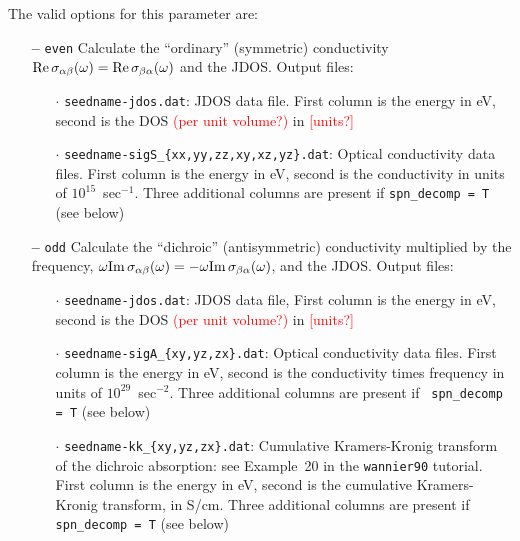 The valid options for this parameter are:
\begin{itemize}

\item[{\bf --}] \verb#even# Calculate the ``ordinary'' (symmetric)
  conductivity ${\rm Re}\,\sigma_{\alpha\beta}(\omega)={\rm
    Re}\,\sigma_{\beta\alpha}(\omega)$ and the JDOS. Output files:

  \begin{itemize}

  \item[$\cdot$] {\tt seedname-jdos.dat}: JDOS data file. First column is the energy
in eV, second is the DOS \textcolor{red}{(per unit volume?)} in \textcolor{red}{{[units?]}}

  \item[$\cdot$] {\tt seedname-sigS\_\{xx,yy,zz,xy,xz,yz\}.dat}:
    Optical conductivity data files. First column is the energy in eV, second is
the conductivity in units of $10^{15}$~sec$^{-1}$. Three additional columns are present if
{\tt spn\_decomp = T} (see below)

  \end{itemize}

\item[{\bf --}] \verb#odd# Calculate the ``dichroic'' (antisymmetric)
  conductivity multiplied by the frequency, $\omega{\rm
    Im}\,\sigma_{\alpha\beta}(\omega)=-\omega{\rm
    Im}\,\sigma_{\beta\alpha}(\omega)$, and the JDOS. Output files:

  \begin{itemize}

  \item[$\cdot$] {\tt seedname-jdos.dat}: JDOS data file, First column is the energy
in eV, second is the DOS \textcolor{red}{(per unit volume?)} in \textcolor{red}{{[units?]}}

\item[$\cdot$] {\tt seedname-sigA\_\{xy,yz,zx\}.dat}: Optical
  conductivity data files. First column is the energy in eV, second is
  the conductivity times frequency in units of
  $10^{29}$~sec$^{-2}$. Three additional columns are present if {\tt
    spn\_decomp = T} (see below)

\item[$\cdot$] {\tt seedname-kk\_\{xy,yz,zx\}.dat}: Cumulative
  Kramers-Kronig transform of the dichroic absorption: see Example~20
  in the {\tt wannier90} tutorial. First column is the energy in eV,
  second is the cumulative Kramers-Kronig transform, in S/cm. Three
  additional columns are present if {\tt spn\_decomp = T} (see below)

  \end{itemize}


\end{itemize}

